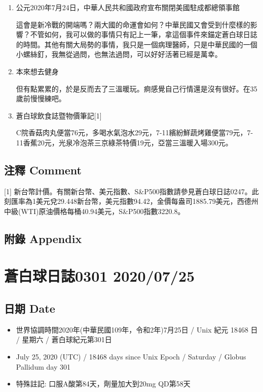 \documentclass[
]{article}
\providecommand{\tightlist}{%
  \setlength{\itemsep}{0pt}\setlength{\parskip}{0pt}}
\begin{document}
\begin{enumerate}
\def\labelenumi{\arabic{enumi}.}
\item
  公元2020年7月24日，中華人民共和國政府宣布關閉美國駐成都總領事館

  這會是新冷戰的開端嗎？兩大國的命運會如何？中華民國又會受到什麼樣的影響？不管如何，我可以做的事情只有記上一筆，拿這個事件來錨定蒼白球日誌的時間。其他有關大局勢的事情，我只是一個病理醫師，只是中華民國的一個小螺絲釘，我無從過問，也無法過問，可以好好活著已經是萬幸。
\item
  本來想去健身

  但有點累累的，於是反而去了三溫暖玩。痾感覺自己行情還是沒有很好。在35歲前慢慢練吧。
\item
  蒼白球飲食誌暨物價筆記{[}1{]}

  C院香菇肉丸便當76元，多喝水氣泡水29元，7-11繽紛鮮蔬烤雞便當79元，7-11香蕉20元，光泉冷泡茶三京綠茶特價19元，亞當三溫暖入場300元。
\end{enumerate}

\hypertarget{ux6ce8ux91cb-comment-21}{%
\subsection{注釋 Comment}\label{ux6ce8ux91cb-comment-21}}

{[}1{]}
新台幣計價。有關新台幣、美元指數、S\&P500指數請參見蒼白球日誌0247。此刻匯率為1美元兌29.448新台幣，美元指數94.42，金價每盎司1885.79美元，西德州中級(WTI)原油價格每桶40.94美元，S\&P500指數3220.8。

\hypertarget{ux9644ux9304-appendix-21}{%
\subsection{附錄 Appendix}\label{ux9644ux9304-appendix-21}}

\hypertarget{ux84bcux767dux7403ux65e5ux8a8c0301-20200725}{%
\section{蒼白球日誌0301
2020/07/25}\label{ux84bcux767dux7403ux65e5ux8a8c0301-20200725}}

\hypertarget{ux65e5ux671f-date-22}{%
\subsection{日期 Date}\label{ux65e5ux671f-date-22}}

\begin{itemize}
\tightlist
\item
  世界協調時間2020年(中華民國109年，令和2年)7月25日 / Unix 紀元 18468 日
  / 星期六 / 蒼白球紀元第301日
\item
  July 25, 2020 (UTC) / 18468 days since Unix Epoch / Saturday / Globus
  Pallidum day 301
\item
  特殊註記: 口服A酸第84天，劑量加大到20mg QD第58天
\end{itemize}
\end{document}
